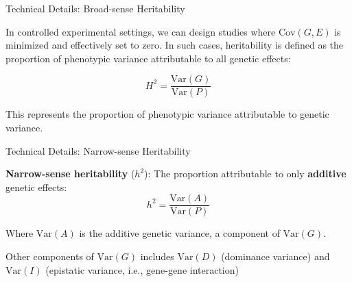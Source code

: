 \begin{frame}{Technical Details: Broad-sense Heritability}

In controlled experimental settings, we can design studies where $\text{Cov}(G,E)$ is minimized and effectively set to zero. In such cases, heritability is defined as the proportion of phenotypic variance attributable to all genetic effects:

$$H^2 = \frac{\text{Var}(G)}{\text{Var}(P)}$$

This represents the proportion of phenotypic variance attributable to genetic variance.

\end{frame}

\begin{frame}{Technical Details: Narrow-sense Heritability}

\textbf{Narrow-sense heritability} ($h^2$): The proportion attributable to only \textbf{additive} genetic effects:
$$h^2 = \frac{\text{Var}(A)}{\text{Var}(P)}$$

Where $\text{Var}(A)$ is the additive genetic variance, a component of $\text{Var}(G)$. 

Other components of $\text{Var}(G)$ includes $\text{Var}(D)$ (dominance variance) and $\text{Var}(I)$ (epistatic variance, i.e., gene-gene interaction)

\end{frame}

